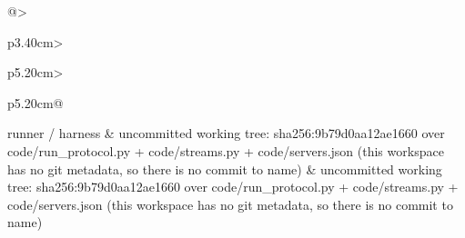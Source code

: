 \begin{longtable}{@{}> {\raggedright\arraybackslash}p{3.40cm}> {\raggedright\arraybackslash}p{5.20cm}> {\raggedright\arraybackslash}p{5.20cm}@{}}
runner / harness & {\footnotesize uncommitte\hspace{0pt}d working tree:\hspace{0pt} sha256:\hspace{0pt}9b79d0aa12\hspace{0pt}ae1660 over code/\hspace{0pt}run\_\hspace{0pt}protocol.p\hspace{0pt}y + code/\hspace{0pt}streams.py\hspace{0pt} + code/\hspace{0pt}servers.js\hspace{0pt}on (this workspace has no git metadata,\hspace{0pt} so there is no commit to name)} & {\footnotesize uncommitte\hspace{0pt}d working tree:\hspace{0pt} sha256:\hspace{0pt}9b79d0aa12\hspace{0pt}ae1660 over code/\hspace{0pt}run\_\hspace{0pt}protocol.p\hspace{0pt}y + code/\hspace{0pt}streams.py\hspace{0pt} + code/\hspace{0pt}servers.js\hspace{0pt}on (this workspace has no git metadata,\hspace{0pt} so there is no commit to name)} \\

\end{longtable}
